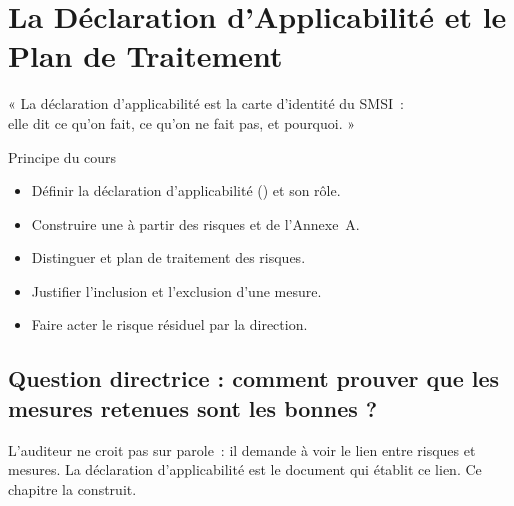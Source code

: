 
\chapter{La Déclaration d'Applicabilité et le Plan de Traitement}
\label{chap:dda}

\epigraph{%
    « La déclaration d'applicabilité est la carte d'identité du SMSI~:\\
    elle dit ce qu'on fait, ce qu'on ne fait pas, et pourquoi. »%
}{Principe du cours}


\begin{boxobjectifs}
\begin{itemize}
    \item Définir la déclaration d'applicabilité () et son rôle.
    \item Construire une  à partir des risques et de l'Annexe~A.
    \item Distinguer  et plan de traitement des risques.
    \item Justifier l'inclusion et l'exclusion d'une mesure.
    \item Faire acter le risque résiduel par la direction.
\end{itemize}
\end{boxobjectifs}

\bigskip

\section*{Question directrice : comment prouver que les mesures retenues sont les bonnes ?}

L'auditeur ne croit pas sur parole~: il demande à voir le lien entre risques et
mesures. La déclaration d'applicabilité est le document qui établit ce lien.
Ce chapitre la construit.

